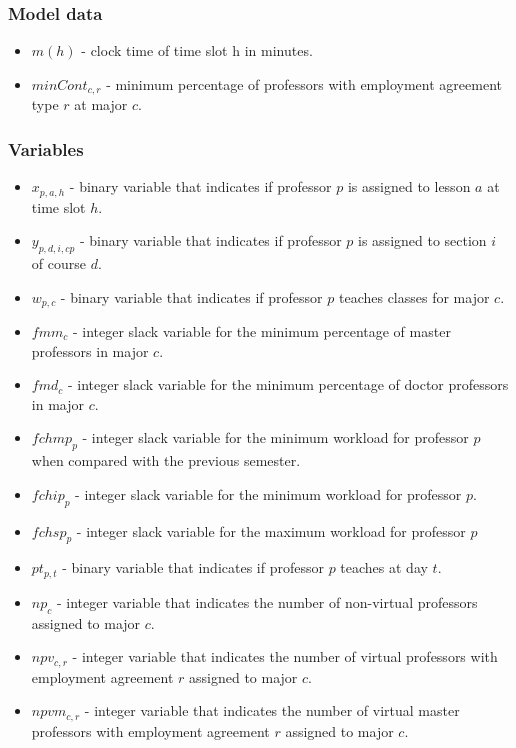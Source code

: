 \subsubsection{Model data}
\begin{itemize}
\item $m(h)$ - clock time of time slot h in minutes.
\item $minCont_{c,r}$ - minimum percentage of professors with employment agreement type $r$ at major $c$.
\end{itemize}

\subsubsection{Variables}
\begin{itemize}
\item $x_{p,a,h}$ - binary variable that indicates if professor $p$ is assigned to lesson $a$ at time slot $h$.
\item $y_{p,d,i,cp}$ - binary variable that indicates if professor $p$ is assigned to section $i$ of course $d$.
\item $w_{p,c}$ - binary variable that indicates if professor $p$ teaches classes for major $c$.
\item $fmm_{c}$ - integer slack variable for the minimum percentage of master professors in major $c$.
\item $fmd_{c}$ - integer slack variable for the minimum percentage of doctor professors in major $c$.
\item $fchmp_{p}$ - integer slack variable for the minimum workload for professor $p$ when compared with the previous semester.
\item $fchip_{p}$ - integer slack variable for the minimum workload for professor $p$.
\item $fchsp_{p}$ - integer slack variable for the maximum workload for professor $p$
\item $pt_{p,t}$ - binary variable that indicates if professor $p$ teaches at day $t$.
\item $np_{c}$ - integer variable that indicates the number of non-virtual professors assigned to major $c$.
\item $npv_{c,r}$ - integer variable that indicates the number of virtual professors with employment agreement $r$ assigned to major $c$.
\item $npvm_{c,r}$ - integer variable that indicates the number of virtual master professors with employment agreement $r$ assigned to major $c$.

\end{itemize}
